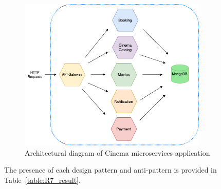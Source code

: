 \documentclass{Configuration_Files/PoliMi3i_thesis}
\begin{document}
\begin{figure}[H]
\centering
\includegraphics[width=0.8\textwidth]{myImages/R7.png}
\caption{Architectural diagram of Cinema microservices application}
\label{fig:R7_arch}
\end{figure}

The presence of each design pattern and anti-pattern is provided in Table~\ref{table:R7_result}.
\end{document}
